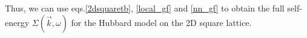 \documentclass[12pt]{article}
\numberwithin{equation}{section}
\begin{document}
Thus, we can use eqs.\eqref{2dsquaretb}, \eqref{local_gf} and \eqref{nn_gf} to obtain the full self-energy $\Sigma (\vec{k},\omega)$ for the Hubbard model on the 2D square lattice.
\end{document}
